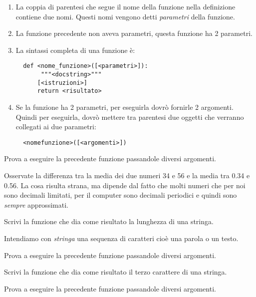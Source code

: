 \begin{osservazione}
 \begin{enumerate} [nosep]
  \item La coppia di parentesi che segue il nome della funzione nella 
definizione contiene due nomi. Questi nomi vengono detti \emph{parametri} 
della funzione.
  \item La funzione precedente non aveva parametri, questa funzione ha 2 
parametri.
  \item La sintassi completa di una funzione è:
\begin{lstlisting}
  def <nome_funzione>([<parametri>]):
       """<docstring>"""
      [<istruzioni>]
      return <risultato>
\end{lstlisting}
  \item Se la funzione ha 2 parametri, per eseguirla dovrò fornirle 2 
argomenti. 
Quindi per eseguirla, dovrò mettere tra parentesi due oggetti che verranno 
collegati ai due parametri:
\begin{lstlisting}
  <nomefunzione>([<argomenti>])
\end{lstlisting}
 \end{enumerate}
\end{osservazione}

Prova a eseguire la precedente funzione passandole diversi argomenti.

\begin{osservazione}
Osservate la differenza tra la media dei due numeri 34 e 56 e la media 
tra 0.34 e 0.56. La cosa risulta strana, ma dipende dal fatto che molti 
numeri che per noi sono decimali limitati, per il computer sono decimali 
periodici e quindi sono \emph{sempre} approssimati.
\end{osservazione}

\begin{esempio}
Scrivi la funzione che dia come risultato la lunghezza di una stringa.

\begin{osservazione}
Intendiamo con \emph{stringa} una sequenza di caratteri cioè una parola o 
un testo.
\end{osservazione}


Prova a eseguire la precedente funzione passandole diversi argomenti.
\end{esempio}

\begin{esempio}
Scrivi la funzione che dia come risultato il terzo carattere di una 
stringa.


Prova a eseguire la precedente funzione passandole diversi argomenti.
\end{esempio}

